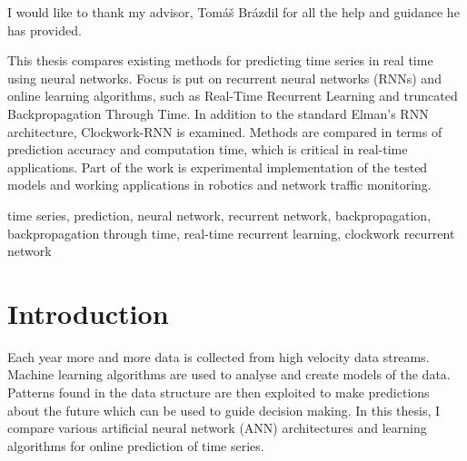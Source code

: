 \documentclass[12pt,oneside]{fithesis2}
\begin{document}
  \FrontMatter                    %
    \ThesisTitlePage                %
    \begin{ThesisDeclaration}       %
      \DeclarationText
      \AdvisorName
    \end{ThesisDeclaration}
    \begin{ThesisThanks}            %
      I would like to thank my advisor, Tomáš Brázdil for all the help and guidance he has provided.
    \end{ThesisThanks}
    \begin{ThesisAbstract}          %
      This thesis compares existing methods for predicting time series in real time using neural networks. Focus is put on recurrent neural networks (RNNs) and online learning algorithms, such as Real-Time Recurrent Learning and truncated Backpropagation Through Time. In addition to the standard Elman's RNN architecture, \mbox{Clockwork-RNN} is examined. Methods are compared in terms of prediction accuracy and computation time, which is critical in real-time applications. Part of the work is experimental implementation of the tested models and working applications in robotics and  network traffic monitoring.
    \end{ThesisAbstract}
    \begin{ThesisKeyWords}          %
	time series, prediction, neural network, recurrent network, backpropagation, backpropagation through time, real-time recurrent learning, clockwork recurrent network
    \end{ThesisKeyWords}
    \tableofcontents                %
   \listoftables                   %
   \listoffigures                  %
   
  
  \MainMatter
    \chapter{Introduction} %
Each year more and more data is collected from high velocity data streams. Machine learning algorithms are used to analyse and create models of the data. Patterns found in the data structure are then exploited to make predictions about the future which can be used to guide decision making. In this thesis, I compare various artificial neural network (ANN) architectures and learning algorithms for online prediction of time series.
\end{document}
